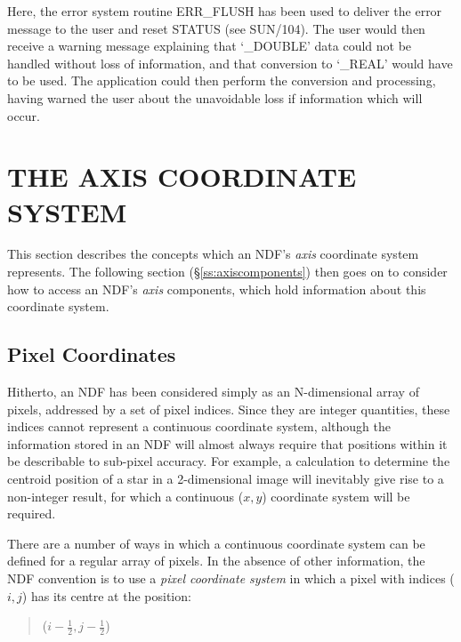 \documentclass[twoside,11pt]{article}
\newcommand{\xref}[3]{#1}
\newcommand{\xlabel}[1]{}
\newcommand{\st}[1]{{\em{#1}}}
\begin{document}
Here, the error system routine \xref{ERR\_FLUSH}{sun104}{ERR_FLUSH}
has been used to deliver the error message to the user and reset
STATUS (see \xref{SUN/104}{sun104}{err}).
The user would then receive a warning message explaining that `\_DOUBLE'
data could not be handled without loss of information, and that conversion
to `\_REAL' would have to be used. 
The application could then perform the conversion and processing, having
warned the user about the unavoidable loss if information which will occur. 


\section{\xlabel{the_axis_coordinate_system}\label{ss:axiscoordinates}THE AXIS COORDINATE SYSTEM}

This section describes the concepts which an NDF's \st{axis\/} coordinate
system represents.
The following section (\S\ref{ss:axiscomponents}) then goes on to consider
how to access an NDF's \st{axis\/} components, which hold information about
this coordinate system. 

\subsection{\xlabel{pixel_coordinates}\label{ss:pixelcoordinates}Pixel Coordinates}

Hitherto, an NDF has been considered simply as an N-dimensional array of
pixels, addressed by a set of pixel indices.
Since they are integer quantities, these indices cannot represent a
continuous coordinate system, although the information stored in an NDF will
almost always require that positions within it be describable to sub-pixel
accuracy. 
For example, a calculation to determine the centroid position of a star in a
2-dimensional image will inevitably give rise to a non-integer result, for
which a continuous ($x,y$) coordinate system will be required. 

There are a number of ways in which a continuous coordinate system can be
defined for a regular array of pixels. 
In the absence of other information, the NDF convention is to use a
\st{pixel coordinate system\/} in which a pixel with indices ($i,j$)
has 
its centre at the position:

\small
\begin{quote}
\begin{center}
($i-\frac{1}{2},j-\frac{1}{2}$)
\end{center}
\end{quote}
\normalsize
\end{document}
